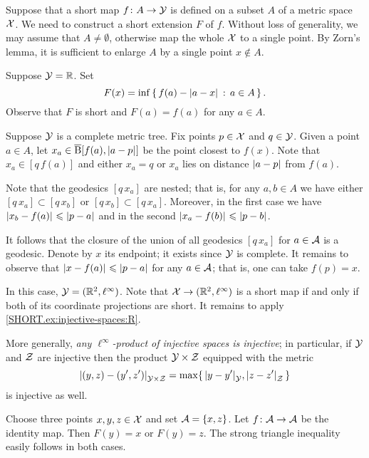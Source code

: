 Suppose that a short map $f\colon A\to\mathcal{Y}$ is defined on a subset $A$ of a metric space $\mathcal{X}$.
We need to construct a short extension $F$ of $f$.
Without loss of generality, we may assume that $A\ne\emptyset$, otherwise map the whole $\mathcal{X}$ to a single point.
By Zorn's lemma, it is sufficient to enlarge $A$ by a single point $x\notin A$.

Suppose $\mathcal{Y}=\mathbb{R}$.
Set 
\[F(x)=\inf\set{f(a)-\dist{a}{x}{}}{a\in A}.\] 
Observe that $F$ is short and $F(a)=f(a)$ for any $a\in A$.

Suppose  $\mathcal{Y}$ is a complete metric tree.
Fix points $p\in \mathcal{X}$ and $q\in\mathcal{Y}$.
Given a point $a\in A$,
let $x_a\in\cBall[f(a),\dist{a}{p}{}]$ be the point closest to $f(x)$.
Note that $x_a\in[q\,f(a)]$ and either $x_a=q$ or $x_a$ lies on distance $\dist{a}{p}{}$ from $f(a)$.

Note that the geodesics $[q\,x_a]$ are nested;
that is, for any $a,b\in A$ we have either $[q\,x_a]\subset [q\,x_b]$ or $[q\,x_b]\subset [q\,x_a]$.
Moreover, in the first case we have $\dist{x_b}{f(a)}{}\le \dist{p}{a}{}$ and in the second $\dist{x_a}{f(b)}{}\le \dist{p}{b}{}$.

It follows that the closure of the union of all geodesics $[q\,x_a]$ for $a\in\mathcal{A}$ is a geodesic.
Denote by $x$ its endpoint; it exists since $\mathcal{Y}$ is complete.
It remains to observe that $\dist{x}{f(a)}{}\le \dist{p}{a}{}$ for any $a\in\mathcal{A}$;
that is, one can take $f(p)=x$.

In this case, $\mathcal{Y}=(\mathbb{R}^2,\ell^\infty)$.
Note that $\mathcal{X}\to (\mathbb{R}^2,\ell^\infty)$ is a short map if and only if both of its coordinate projections are short.
It remains to apply \ref{SHORT.ex:injective-spaces:R}.

More generally, \textit{any $\ell^\infty$-product of injective spaces is injective};
in particular, if $\mathcal{Y}$ and $\mathcal{Z}$ are injective then the product $\mathcal{Y}\times\mathcal{Z}$ equipped with the metric 
\[\dist{(y,z)}{(y',z')}{\spc{Y}\times\spc{Z}}=\max\{\,\dist{y}{y'}{\spc{Y}},\dist{z}{z'}{\spc{Z}}\,\}\]
is injective as well.


Choose three points $x,y,z\in\mathcal{X}$ and set $\mathcal{A}=\{x,z\}$.
Let $f\:\spc{A}\z\to \spc{A}$ be the identity map.
Then $F(y)=x$ or $F(y)=z$.
The strong triangle inequality easily follows in both cases.

